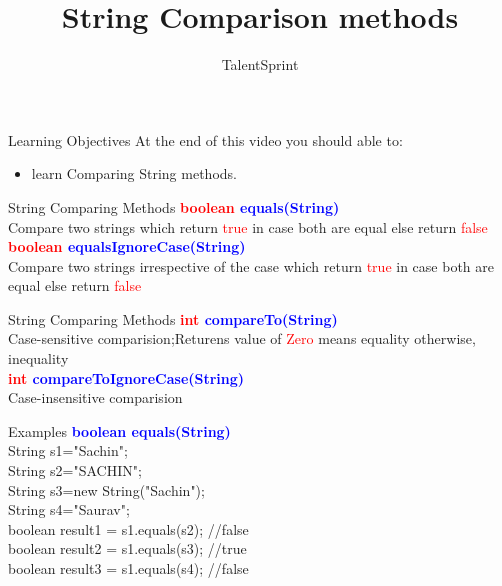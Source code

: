 \documentclass[aspectratio=169,14pt,usenames,dvipsnames]{beamer}
\title[String Comparison methods]{String Comparison methods}
\begin{document}
{\1
\begin{frame} \vspace{35pt}

\subtitle{TalentSprint}
\maketitle
\end{frame}
}

\begin{frame}{Learning Objectives}
At the end of this video you should able to:
\begin{itemize}
\item learn Comparing String methods.
\end{itemize}
\end{frame}

\begin{frame}{String Comparing Methods}
\textbf{\textcolor{red}{boolean} \textcolor{blue}{equals(String)}}\\
Compare two strings which return \textcolor{red}{true} in case both are equal else return \textcolor{red}{false}\\
\vspace{1em}
\textbf{\textcolor{red}{boolean} \textcolor{blue}{equalsIgnoreCase(String)}}\\
Compare two strings irrespective of the case which return \textcolor{red}{true} in case both are equal else return \textcolor{red}{false}
\end{frame}


\begin{frame}{String Comparing Methods}
\textbf{\textcolor{red}{int} \textcolor{blue}{compareTo(String)}}\\
Case-sensitive comparision;Returens value of \textcolor{red}{Zero} means equality otherwise, inequality\\
\vspace{1em}
\textbf{\textcolor{red}{int} \textcolor{blue}{compareToIgnoreCase(String)}}\\
Case-insensitive comparision
\end{frame}

\begin{frame}{Examples}
\textbf{\textcolor{blue}{boolean equals(String)}}\\
String s1="Sachin";\\
String s2="SACHIN";\\
String s3=new String("Sachin");\\
String s4="Saurav";\\
boolean result1 = s1.equals(s2); //false\\
boolean result2 = s1.equals(s3); //true\\
boolean result3 = s1.equals(s4); //false\\

\end{frame}
\end{document}
